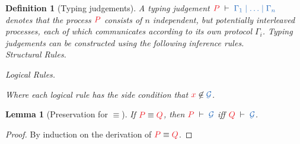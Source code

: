 \documentclass[draft,submission,copyright,creativecommons]{eptcs}
\newtheorem{definition}{Definition}
\newtheorem{lemma}{Lemma}
\begin{document}
\begin{definition}[Typing judgements]\label{def:hcp}
  A typing judgement $\seq[P]{\Gamma_1 \hsep \dots \hsep \Gamma_n}$ denotes
  that the process $\tm{P}$ consists of $n$ independent, but potentially
  interleaved processes, each of which communicates according to its own
  protocol $\Gamma_i$. 
  Typing judgements can be constructed using the following inference rules.
  \\[0.5\baselineskip]
  Structural Rules.
  \begin{center}\hccpInfAx        \hccpInfCycle\end{center}\vspace*{-.5\baselineskip}
  \begin{center}\hccpInfMix       \hccpInfHalt \end{center}\vspace*{-.5\baselineskip}

  Logical Rules.
  \begin{center}\hccpInfBoundTens \hccpInfParr \end{center}\vspace*{-.5\baselineskip}
  \begin{center}\hccpInfOne       \hccpInfBot  \end{center}\vspace*{-.5\baselineskip}
  \begin{center}     \end{center}\vspace*{-.5\baselineskip}
  \begin{center}\hccpInfWith                   \end{center}\vspace*{-.5\baselineskip}
  \begin{center}\hccpInfNil       \hccpInfTop  \end{center}\vspace*{.5\baselineskip}

  Where each logical rule has the side condition that $\tm{x} \not\in
  \ty{\mathcal{G}}$.
\end{definition}

\begin{lemma}[Preservation for $\equiv$]\label{lem:hcp-preservation-equiv}
  If $\tm{P}\equiv\tm{Q}$, then $\seq[P]{\mathcal{G}}$ iff $\seq[Q]{\mathcal G}$.
\end{lemma}
\begin{proof}
  By induction on the derivation of $\tm{P}\equiv\tm{Q}$.
\end{proof}
\end{document}
